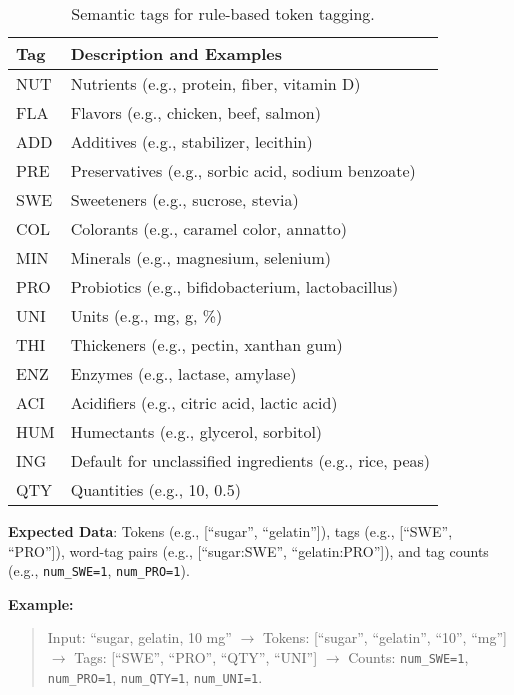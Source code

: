 \documentclass[11pt]{article}
\begin{document}
\begin{table}[h]
    \centering
    \caption{Semantic tags for rule-based token tagging.}
    \label{tab:tags}
    \begin{tabular}{ll}
        \toprule
        \textbf{Tag} & \textbf{Description and Examples} \\
        \midrule
        NUT & Nutrients (e.g., protein, fiber, vitamin D) \\
        FLA & Flavors (e.g., chicken, beef, salmon) \\
        ADD & Additives (e.g., stabilizer, lecithin) \\
        PRE & Preservatives (e.g., sorbic acid, sodium benzoate) \\
        SWE & Sweeteners (e.g., sucrose, stevia) \\
        COL & Colorants (e.g., caramel color, annatto) \\
        MIN & Minerals (e.g., magnesium, selenium) \\
        PRO & Probiotics (e.g., bifidobacterium, lactobacillus) \\
        UNI & Units (e.g., mg, g, \%) \\
        THI & Thickeners (e.g., pectin, xanthan gum) \\
        ENZ & Enzymes (e.g., lactase, amylase) \\
        ACI & Acidifiers (e.g., citric acid, lactic acid) \\
        HUM & Humectants (e.g., glycerol, sorbitol) \\
        ING & Default for unclassified ingredients (e.g., rice, peas) \\
        QTY & Quantities (e.g., 10, 0.5) \\
        \bottomrule
    \end{tabular}
\end{table}

\textbf{Expected Data}: Tokens (e.g., [``sugar'', ``gelatin'']), tags (e.g., [``SWE'', ``PRO'']), word-tag pairs (e.g., [``sugar:SWE'', ``gelatin:PRO'']), and tag counts (e.g., \texttt{num\_SWE=1}, \texttt{num\_PRO=1}).

\textbf{Example:}
\begin{quote}
Input: ``sugar, gelatin, 10 mg'' $\to$ Tokens: [``sugar'', ``gelatin'', ``10'', ``mg''] $\to$ Tags: [``SWE'', ``PRO'', ``QTY'', ``UNI''] $\to$ Counts: \texttt{num\_SWE=1}, \texttt{num\_PRO=1}, \texttt{num\_QTY=1}, \texttt{num\_UNI=1}.
\end{quote}
\end{document}
